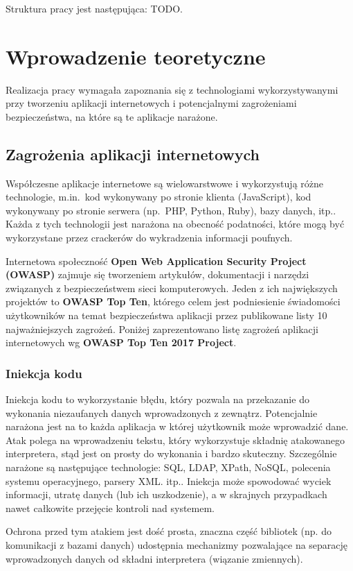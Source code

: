 \documentclass[11pt,a4paper,polish,thesis,oneside]{dcsbook}
\begin{document}
Struktura pracy jest następująca: TODO.


\chapter{Wprowadzenie teoretyczne}
Realizacja pracy wymagała zapoznania się z technologiami wykorzystywanymi przy tworzeniu aplikacji internetowych i potencjalnymi zagrożeniami bezpieczeństwa, na które są te aplikacje narażone.
\section{Zagrożenia aplikacji internetowych}
Współczesne aplikacje internetowe są wielowarstwowe i wykorzystują różne technologie, m.in.~kod wykonywany po stronie klienta (JavaScript), kod wykonywany po stronie serwera (np.~PHP, Python, Ruby), bazy danych, itp.. Każda z tych technologii jest narażona na obecność podatności, które mogą być wykorzystane przez crackerów do wykradzenia informacji poufnych.

Internetowa społeczność \textbf{Open Web Application Security Project (OWASP)}\cite{owasp} zajmuje się tworzeniem artykułów, dokumentacji i narzędzi związanych z bezpieczeństwem sieci komputerowych. Jeden z ich największych projektów to \textbf{OWASP Top Ten}, którego celem jest podniesienie świadomości użytkowników na temat bezpieczeństwa aplikacji przez publikowane listy 10 najważniejszych zagrożeń. Poniżej zaprezentowano listę zagrożeń aplikacji internetowych wg \textbf{OWASP Top Ten 2017 Project}.

\subsection{Iniekcja kodu}
Iniekcja kodu to wykorzystanie błędu, który pozwala na przekazanie do wykonania niezaufanych danych wprowadzonych z zewnątrz. Potencjalnie narażona jest na to każda aplikacja w której użytkownik może wprowadzić dane. Atak polega na wprowadzeniu tekstu, który wykorzystuje składnię atakowanego interpretera, stąd jest on prosty do wykonania i bardzo skuteczny. Szczególnie narażone są następujące technologie: SQL, LDAP, XPath, NoSQL, polecenia systemu operacyjnego, parsery XML. itp.. Iniekcja może spowodować wyciek informacji, utratę danych (lub ich uszkodzenie), a w skrajnych przypadkach nawet całkowite przejęcie kontroli nad systemem.

Ochrona przed tym atakiem jest dość prosta, znaczna część bibliotek (np. do komunikacji z bazami danych) udostępnia mechanizmy pozwalające na separację wprowadzonych danych od składni interpretera (wiązanie zmiennych).
\end{document}
